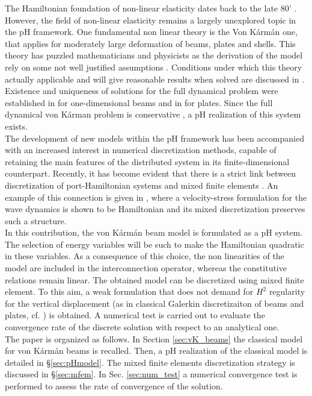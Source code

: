 \documentclass{ifacconf}
\newcommand{\secref}[1]{\S\ref{#1}}
\begin{document}
The Hamiltonian foundation of non-linear elasticity dates back to the late 80' \cite{simo1988}. However, the field of non-linear elasticity remains a largely unexplored topic in the pH framework. One fundamental non linear theory is the Von K\'arm\'an one, that applies for moderately large deformation of beams, plates and shells. This theory has puzzled mathematicians and physicists as the derivation of the model rely on some not well justified assumptions \cite{ciarlet1980}. Conditions under which this theory actually applicable and will give reasonable results when solved are discussed in \cite{ciarlet1980,ciarlet1990}. Existence and uniqueness of solutions for the full dynamical problem were established in \cite{lagnese1991uniform} for one-dimensional beams and in \cite{puel1996} for plates. Since the full dynamical von K\'arman problem is conservative \cite{bilbao2015conservative}, a pH realization of this system exists. \\

The development of new models within the pH framework has been accompanied with an increased interest in numerical discretization methods, capable of retaining the main features of the distributed system in its finite-dimensional counterpart. Recently, it has become evident that there is a strict link between  discretization of port-Hamiltonian  systems and mixed finite elements \cite{cardoso2020pfem}. An example of this connection is given in \cite{kirby2015}, where a velocity-stress formulation for the wave dynamics is shown to be Hamiltonian and its mixed discretization preserves such a structure. \\

In this contribution, the von K\'arm\'an beam model is formulated as a pH system. The selection of energy variables will be such to make the Hamiltonian quadratic in these variables. As a consequence of this choice, the non linearities of the model are included in the interconnection operator, whereas the constitutive relations remain linear. The obtained model can be discretized using mixed finite element. To this aim, a weak formulation that does not demand for $H^2$ regularity for the vertical displacement (as in classical Galerkin discretizaiton of beams and plates, cf. \cite{gustafsson2018}) is obtained. A numerical test is carried out to evaluate the convergence rate of the discrete solution with respect to an analytical one. \\

The paper is organized as follows. In Section \ref{sec:vK_beams} the classical model for von K\'arm\'an beams is recalled. Then, a pH realization of the classical model is detailed in \secref{sec:pHmodel}. The mixed finite elements discretization strategy is discussed in \secref{sec:mfem}. In Sec. \ref{sec:num_test} a numerical convergence test is performed to assess the rate of convergence of the solution.
\end{document}

